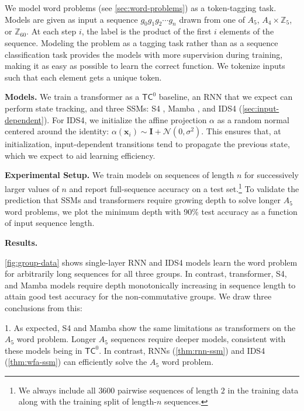 We model word problems (see \ref{sec:word-problems}) as a token-tagging task. Models are given as input a sequence $g_0g_1g_2 \cdots g_n$ drawn from one of $A_5$, $A_4 \times \mathbb{Z}_5$, or $\mathbb{Z}_{60}$. At each step $i$, the label is the product of the first $i$ elements of the sequence. Modeling the problem as a tagging task rather than as a sequence classification task provides the models with more supervision during training, making it as easy as possible to learn the correct function. We tokenize inputs such that each element gets a unique token.

 \textbf{Models.}
We train a transformer as a $\mathsf{TC}^0$ baseline, an RNN that we expect can perform state tracking, and three SSMs: S4 \citep{gu2022efficiently}, Mamba \citep{gu2023mamba}, and IDS4 (\ref{sec:input-dependent}).
For IDS4, we initialize the affine projection $\alpha$ as a random normal centered around the identity: $\alpha(\mathbf x_i) \sim \mathbf I + \mathcal N(0, \sigma^2)$. 
This ensures that, at initialization, input-dependent transitions tend to propagate the previous state, which we expect to aid learning efficiency.

 \textbf{Experimental Setup.} We train models on sequences of length $n$ for successively larger values of $n$ and report full-sequence accuracy on a test set.\footnote{We always include all $3600$ pairwise sequences of length $2$ in the training data along with the training split of length-$n$ sequences.} To validate the prediction that SSMs and transformers require growing depth to solve longer $A_5$ word problems, we plot the minimum depth with 90\% test accuracy as a function of input sequence length. 

 \textbf{Results.}

\ref{fig:group-data} shows single-layer RNN and IDS4 models learn the word problem for arbitrarily long sequences for all three groups. In contrast, transformer, S4, and Mamba models require depth monotonically increasing in sequence length to attain good test accuracy for the non-commutative groups. We draw three conclusions from this:

    1. As expected, S4 and Mamba show the same limitations as transformers on the $A_5$ word problem. Longer $A_5$ sequences require deeper models, consistent with these models being in $\mathsf{TC}^0$. In contrast, RNNs (\ref{thm:rnn-ssm}) and IDS4 (\ref{thm:wfa-ssm}) can efficiently solve the $A_5$ word problem.

